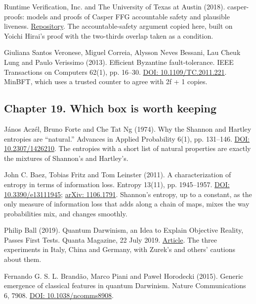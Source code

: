 \noindent Runtime Verification, Inc. and The University of Texas at Austin (2018). casper-proofs: models and proofs of Casper FFG accountable safety and plausible liveness. \href{https://github.com/runtimeverification/casper-proofs}{Repository}. The accountable-safety argument copied here, built on Yoichi Hirai's proof with the two-thirds overlap taken as a condition.
\par\medskip

\noindent Giuliana Santos Veronese, Miguel Correia, Alysson Neves Bessani, Lau Cheuk Lung and Paulo Verissimo (2013). Efficient Byzantine fault-tolerance. IEEE Transactions on Computers 62(1), pp. 16--30. \href{https://doi.org/10.1109/TC.2011.221}{DOI: 10.1109/TC.2011.221}. MinBFT, which uses a trusted counter to agree with 2f + 1 copies.
\par\medskip

\subsection*{Chapter 19. Which box is worth keeping}

\noindent J\'anos Acz\'el, Bruno Forte and Che Tat Ng (1974). Why the Shannon and Hartley entropies are ``natural.'' Advances in Applied Probability 6(1), pp. 131--146. \href{https://doi.org/10.2307/1426210}{DOI: 10.2307/1426210}. The entropies with a short list of natural properties are exactly the mixtures of Shannon's and Hartley's.
\par\medskip

\noindent John C. Baez, Tobias Fritz and Tom Leinster (2011). A characterization of entropy in terms of information loss. Entropy 13(11), pp. 1945--1957. \href{https://doi.org/10.3390/e13111945}{DOI: 10.3390/e13111945}; \href{https://arxiv.org/abs/1106.1791}{arXiv: 1106.1791}. Shannon's entropy, up to a constant, as the only measure of information loss that adds along a chain of maps, mixes the way probabilities mix, and changes smoothly.
\par\medskip

\noindent Philip Ball (2019). Quantum Darwinism, an Idea to Explain Objective Reality, Passes First Tests. Quanta Magazine, 22 July 2019. \href{https://www.quantamagazine.org/quantum-darwinism-an-idea-to-explain-objective-reality-passes-first-tests-20190722/}{Article}. The three experiments in Italy, China and Germany, with Zurek's and others' cautions about them.
\par\medskip

\noindent Fernando G. S. L. Brand\~ao, Marco Piani and Pawe\l{} Horodecki (2015). Generic emergence of classical features in quantum Darwinism. Nature Communications 6, 7908. \href{https://doi.org/10.1038/ncomms8908}{DOI: 10.1038/ncomms8908}.
\par\medskip


